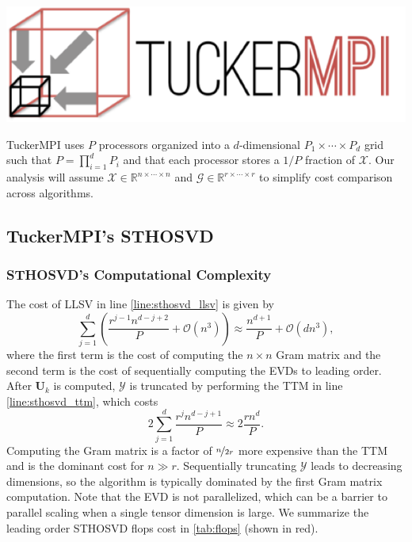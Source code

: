 
\begin{center}
    \includegraphics[scale=0.5]{tikz/chapter3/TuckerMPI-logo.png}
\end{center}

TuckerMPI uses $P$ processors organized into a $d$-dimensional $P_1\times \cdots
\times P_d$ grid such that $P = \prod_{i=1}^{d} P_i$ and that each processor
stores a $1/P$ fraction of $\mathcal{X}$. Our analysis will assume $\mathcal{X}
\in \mathbb{R}^{n\times \cdots \times n}$ and $\mathcal{G} \in
\mathbb{R}^{r\times \cdots \times r}$ to simplify cost comparison across
algorithms.

\subsection{TuckerMPI's STHOSVD} \label{sec:TuckerMPI's STHOSVD}
    \subsubsection{STHOSVD's Computational Complexity} \label{STHOSVD's Computational Complexity}

        The cost of LLSV in line \ref{line:sthosvd_llsv} is given by
        \begin{equation*}
            \sum_{j=1}^{d} \left(\frac{r^{j-1}n^{d-j+2}}{P} + \mathcal{O}(n^3)\right) \approx \frac{n^{d+1}}{P} + \mathcal{O}(dn^3),
        \end{equation*}
        where the first term is the cost of computing the $n \times n$ Gram matrix and
        the second term is the cost of sequentially computing the EVDs to leading order.
        After $\mathbf{U}_{k}$ is computed, $\mathcal{Y}$ is truncated by
        performing the TTM in line \ref{line:sthosvd_ttm}, which costs
        \begin{equation*}
            2\sum_{j=1}^{d} \frac{r^j n^{d-j+1}}{P} \approx 2\frac{rn^d}{P}.
        \end{equation*}
        Computing the Gram matrix is a factor of $\nicefrac{n}{2r}$ more expensive than
        the TTM and is the dominant cost for $n \gg r$. Sequentially truncating $\mathcal{Y}$
        leads to decreasing dimensions, so the algorithm is typically dominated by the
        first Gram matrix computation. Note that the EVD is not parallelized, which can
        be a barrier to parallel scaling when a single tensor dimension is large. We
        summarize the leading order STHOSVD flops cost in \cref{tab:flops} (shown in
        red).

